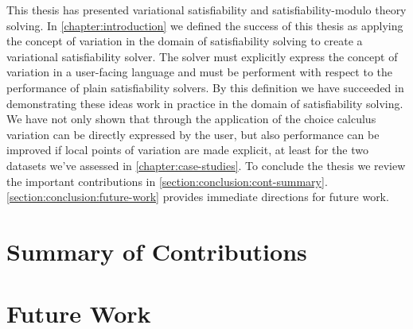 \label{chapter:conclusion}
%
This thesis has presented variational satisfiability and satisfiability-modulo
theory solving. In \autoref{chapter:introduction} we defined the success of this
thesis as applying the concept of variation in the domain of satisfiability
solving to create a variational satisfiability solver. The solver must
explicitly express the concept of variation in a user-facing language and must
be performent with respect to the performance of plain satisfiability solvers.
By this definition we have succeeded in demonstrating these ideas work in
practice in the domain of satisfiability solving. We have not only shown that
through the application of the choice calculus variation can be directly
expressed by the user, but also performance can be improved if local points of
variation are made explicit, at least for the two datasets we've assessed in
\autoref{chapter:case-studies}.
%
To conclude the thesis we review the important contributions in
\autoref{section:conclusion:cont-summary}.
\autoref{section:conclusion:future-work} provides immediate directions for
future work.

\section{Summary of Contributions}

%
\section{Future Work}

%




